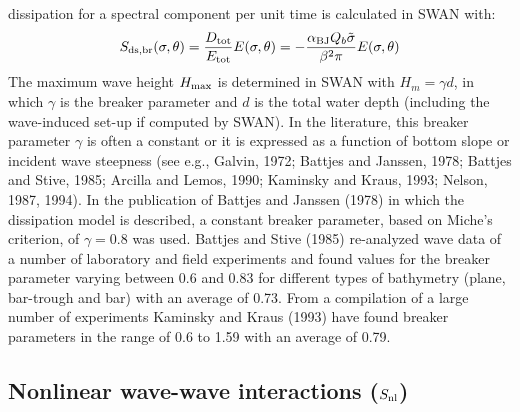 \documentclass[12pt]{book}
\begin{document}
dissipation for a spectral component per unit time is calculated in SWAN with:
\begin{equation}
  S_{\rm ds,br} (\sigma,\theta) = \frac{D_{\rm tot}}{E_{\rm tot}} E(\sigma,\theta) =
  -\frac{\alpha_{\rm BJ} Q_b \tilde{\sigma}}{\beta^2 \pi} E(\sigma,\theta)
  \label{eq3-26}
\end{equation}
The maximum wave height $H_{\rm max}$ is determined in SWAN with $H_m = \gamma d$, in which $\gamma$ is the breaker parameter
and $d$ is the total water depth (including the wave-induced set-up if computed by SWAN). In the literature,
this breaker parameter $\gamma$ is often a constant or it is expressed as a function of bottom slope or incident
wave steepness (see e.g., Galvin, 1972; Battjes and Janssen, 1978; Battjes and Stive, 1985; Arcilla and
Lemos, 1990; Kaminsky and Kraus, 1993; Nelson, 1987, 1994).
In the publication of Battjes and Janssen (1978) in which the dissipation model is described, a constant
breaker parameter, based on Miche's criterion, of $\gamma=0.8$ was used. Battjes and Stive (1985) re-analyzed
wave data of a number of laboratory and field experiments and found values for the breaker parameter
varying between 0.6 and 0.83 for different types of bathymetry (plane, bar-trough and bar) with an average
of 0.73. From a compilation of a large number of experiments Kaminsky and Kraus (1993) have found
breaker parameters in the range of 0.6 to 1.59 with an average of 0.79.
\nocite{Arc90L,Kam93K,Nel87,Nel94}

\subsection{Nonlinear wave-wave interactions ($S_{\rm nl}$)} \label{sec:waveint}
\end{document}
